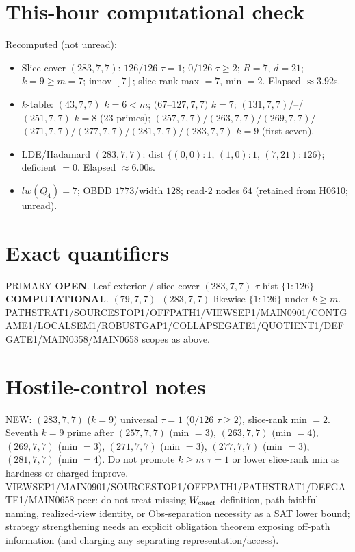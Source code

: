 \documentclass[11pt]{article}
\begin{document}
\section*{This-hour computational check}
Recomputed (not unread):
\begin{itemize}
\item Slice-cover $(283,7,7)$: $126/126$ $\tau{=}1$; $0/126$ $\tau{\ge}2$; $R{=}7$, $d{=}21$;
  $k{=}9{\ge}m{=}7$; innov $[7]$; slice-rank max $=7$, min $=2$. Elapsed $\approx3.92$s.
\item $k$-table: $(43,7,7)$ $k{=}6{<}m$; $(67$--$127,7,7)$ $k{=}7$;
  $(131,7,7)$/--/$(251,7,7)$ $k{=}8$ (23 primes); $(257,7,7)$/$(263,7,7)$/$(269,7,7)$/$(271,7,7)$/$(277,7,7)$/$(281,7,7)$/$(283,7,7)$ $k{=}9$ (first seven).
\item LDE/Hadamard $(283,7,7)$: dist $\{(0,0){:}1,\,(1,0){:}1,\,(7,21){:}126\}$; deficient $=0$. Elapsed $\approx6.00$s.
\item $lw(Q_4)=7$; OBDD $1773$/width $128$; read-$2$ nodes $64$ (retained from H0610; unread).
\end{itemize}

\section*{Exact quantifiers}
PRIMARY \textbf{OPEN}. Leaf exterior / slice-cover $(283,7,7)$ $\tau$-hist $\{1{:}126\}$ \textbf{COMPUTATIONAL}.
$(79,7,7)$--$(283,7,7)$ likewise $\{1{:}126\}$ under $k{\ge}m$.
PATHSTRAT1/SOURCESTOP1/OFFPATH1/VIEWSEP1/MAIN0901/CONTGAME1/LOCALSEM1/ROBUSTGAP1/COLLAPSEGATE1/QUOTIENT1/DEFGATE1/MAIN0358/MAIN0658 scopes as above.

\section*{Hostile-control notes}
NEW: $(283,7,7)$ ($k{=}9$) universal $\tau{=}1$ ($0/126$ $\tau{\ge}2$), slice-rank min $=2$.
Seventh $k{=}9$ prime after $(257,7,7)$ (min $=3$), $(263,7,7)$ (min $=4$), $(269,7,7)$ (min $=3$), $(271,7,7)$ (min $=3$), $(277,7,7)$ (min $=3$), $(281,7,7)$ (min $=4$).
Do not promote $k{\ge}m$ $\tau{=}1$ or lower slice-rank min as hardness or charged improve.
VIEWSEP1/MAIN0901/SOURCESTOP1/OFFPATH1/PATHSTRAT1/DEFGATE1/MAIN0658 peer: do not treat missing $W_{\rm exact}$ definition,
path-faithful naming, realized-view identity, or Obs-separation necessity as a SAT lower bound;
strategy strengthening needs an explicit obligation theorem exposing off-path information
(and charging any separating representation/access).
\end{document}
